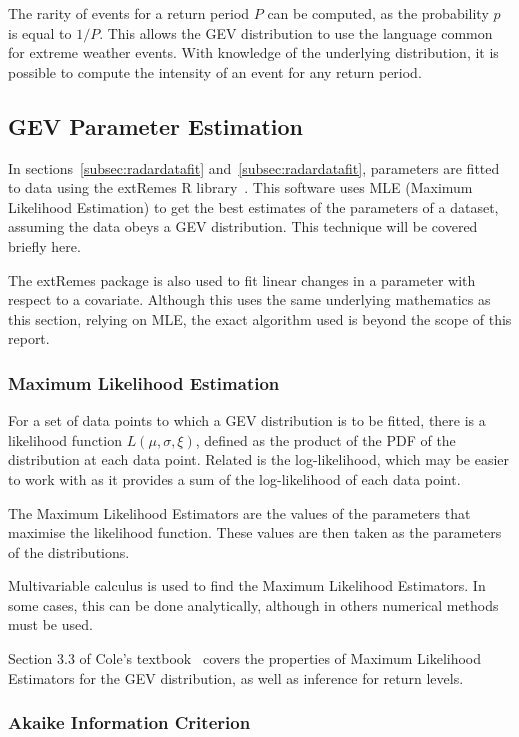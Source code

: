 The rarity of events for a return period $P$ can be computed,
    as the probability $p$ is equal to $1/P$.
This allows the GEV distribution to use the language common for extreme weather events.
With knowledge of the underlying distribution,
    it is possible to compute the intensity of an event for any return period.

\subsection{GEV Parameter Estimation}\label{subsec:parameterest}

In sections~\ref{subsec:radardatafit} and~\ref{subsec:radardatafit},
    parameters are fitted to data using the extRemes R library~\cite{extremes_R}.
This software uses MLE (Maximum Likelihood Estimation) to get the best estimates of the parameters of a dataset,
    assuming the data obeys a GEV distribution.
This technique will be covered briefly here.

The extRemes package is also used to fit linear changes in a parameter with respect to a covariate.
Although this uses the same underlying mathematics as this section,
    relying on MLE,
    the exact algorithm used is beyond the scope of this report.

\subsubsection{Maximum Likelihood Estimation}

For a set of data points to which a GEV distribution is to be fitted,
    there is a likelihood function $L(\mu, \sigma, \xi)$,
    defined as the product of the PDF of the distribution at each data point.
Related is the log-likelihood,
    which may be easier to work with as it provides a sum of the log-likelihood of each data point.

The Maximum Likelihood Estimators are the values of the parameters that maximise the likelihood function.
These values are then taken as the parameters of the distributions.

Multivariable calculus is used to find the Maximum Likelihood Estimators.
In some cases, this can be done analytically,
    although in others numerical methods must be used.

Section 3.3 of Cole's textbook~\cite{Coles_2001} covers the properties of Maximum Likelihood Estimators for the GEV distribution,
    as well as inference for return levels.

\subsubsection{Akaike Information Criterion}


